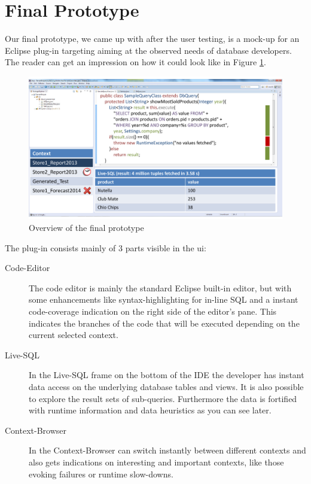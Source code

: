 
\section{Final Prototype}
\label{sec:FINAL_PROTOTYPE}
Our final prototype, we came up with after the user testing, is a mock-up for an Eclipse plug-in targeting aiming at the observed needs of database developers. The reader can get an impression on how it could look like in Figure \ref{fig:final_prototype_overview}.
\begin{figure}
\begin{centering}
    \includegraphics[width=1.0\linewidth]{images/final_prototype}
    \caption{Overview of the final prototype}
    \label{fig:final_prototype_overview}
\end{centering}
\end{figure}
The plug-in consists mainly of 3 parts visible in the ui:
\begin{description}
	\item [Code-Editor] The code editor is mainly the standard Eclipse built-in editor, but with some enhancements like syntax-highlighting for in-line SQL and a instant code-coverage indication on the right side of the editor's pane. This indicates the branches of the code that will be executed depending on the current selected context.
	\item [Live-SQL] In the Live-SQL frame on the bottom of the IDE the developer has instant data access on the underlying database tables and views. It is also possible to explore the result sets of sub-queries. Furthermore the data is fortified with runtime information and data heuristics as you can see later.
	\item [Context-Browser] In the Context-Browser can switch instantly between different contexts and also gets indications on interesting and important contexts, like those evoking failures or runtime slow-downs.
\end{description}
